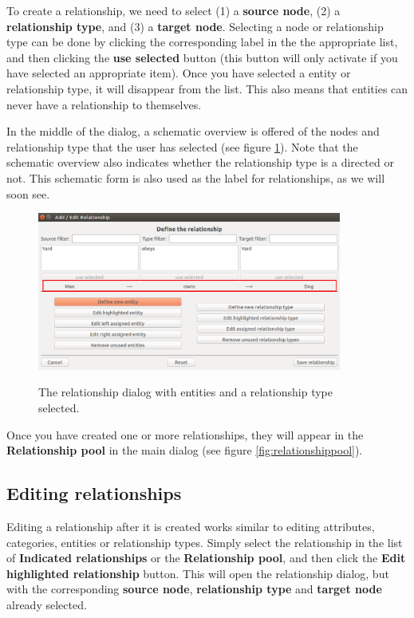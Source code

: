 \documentclass{memoir}
\begin{document}
To create a relationship, we need to select (1) a \textbf{source node}, (2) a \textbf{relationship type}, and (3) a \textbf{target node}. Selecting a node or relationship type can be done by clicking the corresponding label in the the appropriate list, and then clicking the \textbf{use selected} button (this button will only activate if you have selected an appropriate item). Once you have selected a entity or relationship type, it will disappear from the list. This also means that entities can never have a relationship to themselves.

In the middle of the dialog, a schematic overview is offered of the nodes and relationship type that the user has selected (see figure \ref{fig:relationshipdialog3}). Note that the schematic overview also indicates whether the relationship type is a directed or not. This schematic form is also used as the label for relationships, as we will soon see.

\begin{figure}[h!]
  \centering
  \caption{The relationship dialog with entities and a relationship type selected.}
  \includegraphics[width=100mm]{Screenshot_20.pdf}
  \label{fig:relationshipdialog3}
\end{figure}

Once you have created one or more relationships, they will appear in the \textbf{Relationship pool} in the main dialog (see figure \ref{fig:relationshippool}).

\subsection{Editing relationships}
\label{sec:editingrelationships}

Editing a relationship after it is created works similar to editing attributes, categories, entities or relationship types. Simply select the relationship in the list of \textbf{Indicated relationships} or the \textbf{Relationship pool}, and then click the \textbf{Edit highlighted relationship} button. This will open the relationship dialog, but with the corresponding \textbf{source node}, \textbf{relationship type} and \textbf{target node} already selected.
\end{document}
